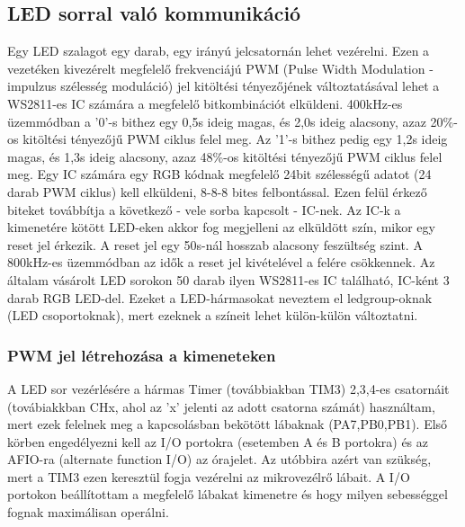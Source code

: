 \documentclass[../main.tex]{subfiles}
\begin{document}
    \subsection{LED sorral való kommunikáció}
        Egy LED szalagot egy darab, egy irányú jelcsatornán lehet vezérelni. Ezen a vezetéken kivezérelt megfelelő frekvenciájú PWM (Pulse Width Modulation - impulzus szélesség moduláció) jel kitöltési tényezőjének változtatásával lehet a WS2811-es IC számára a megfelelő bitkombinációt elküldeni. 400kHz-es üzemmódban a '0'-s bithez egy 0,5\micro s ideig magas, és 2,0\micro s ideig alacsony, azaz 20\%-os kitöltési tényezőjű PWM ciklus felel meg. Az '1'-s bithez pedig egy 1,2\micro s ideig magas, és 1,3\micro s ideig alacsony, azaz 48\%-os kitöltési tényezőjű PWM ciklus felel meg. Egy IC számára egy RGB kódnak megfelelő 24bit szélességű adatot (24 darab PWM ciklus) kell elküldeni, 8-8-8 bites felbontással. Ezen felül érkező biteket továbbítja a következő - vele sorba kapcsolt - IC-nek. Az IC-k a kimenetére kötött LED-eken akkor fog megjelleni az elküldött szín, mikor egy reset jel érkezik. A reset jel egy 50\micro s-nál hosszab alacsony feszültség szint. A 800kHz-es üzemmódban az idők a reset jel kivételével a felére csökkennek. Az általam vásárolt LED sorokon 50 darab ilyen WS2811-es IC található, IC-ként 3 darab RGB LED-del. Ezeket a LED-hármasokat neveztem el ledgroup-oknak (LED csoportoknak), mert ezeknek a színeit lehet külön-külön változtatni. \cite{ds_ws2811}
        
        \subsubsection{PWM jel létrehozása a kimeneteken}
            A LED sor vezérlésére a hármas Timer (továbbiakban TIM3) 2,3,4-es csatornáit (továbiakkban CHx, ahol az 'x' jelenti az adott csatorna számát) használtam, mert ezek felelnek meg a kapcsolásban bekötött lábaknak (PA7,PB0,PB1). Első körben engedélyezni kell az I/O portokra (esetemben A és B portokra) és az AFIO-ra (alternate function I/O) az órajelet. Az utóbbira azért van szükség, mert a TIM3 ezen keresztül fogja vezérelni az mikrovezélrő lábait. A I/O portokon beállítottam a megfelelő lábakat kimenetre és hogy milyen sebességgel fognak maximálisan operálni.
            
\end{document}
